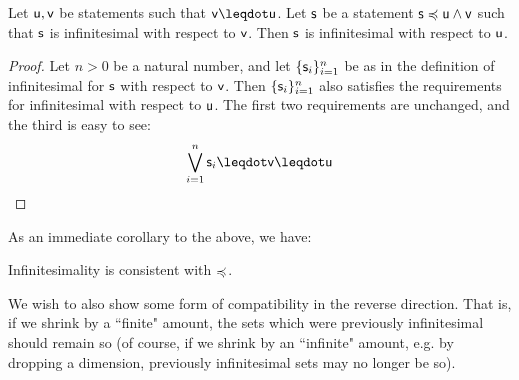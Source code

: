 \documentclass{article}
\begin{document}
\begin{prop}
Let $\stmt[u],\stmt[v]$ be statements such that $\stmt[v]\finer\stmt[u]$. Let $\stmt$ be a statement $\stmt\narrower\stmt[u]\AND\stmt[v]$ such that $\stmt$ is infinitesimal with respect to $\stmt[v]$. Then $\stmt$ is infinitesimal with respect to $\stmt[u]$. 
\end{prop}
\begin{proof}
Let $n>0$ be a natural number, and let $\{ \stmt_i \}_{i=1}^n$ be as in the definition of infinitesimal for $\stmt$ with respect to $\stmt[v]$. Then $\{ \stmt_i \}_{i=1}^n$ also satisfies the requirements for infinitesimal with respect to $\stmt[u]$. The first two requirements are unchanged, and the third is easy to see:
$$
\bigOR\limits_{i=1}^n \stmt_i \finer\stmt[v]\finer \stmt[u]
$$
\end{proof}

As an immediate corollary to the above, we have:
\begin{prop}
Infinitesimality is consistent with $\narrower$.
\end{prop}

We wish to also show some form of compatibility in the reverse direction. That is, if we shrink by a ``finite" amount, the sets which were previously infinitesimal should remain so (of course, if we shrink by an ``infinite" amount, e.g. by dropping a dimension, previously infinitesimal sets may no longer be so). 
\end{document}
